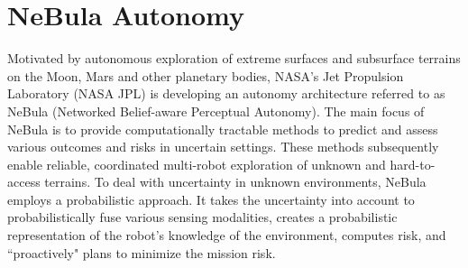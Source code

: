 \documentclass[letterpaper, 10pt, conference]{ieeeconf}      %
\newcommand{\rev}[1]{{\color{blue}#1}} %
\begin{document}
\section{NeBula Autonomy}\label{sec:nebula}
Motivated by autonomous exploration of extreme surfaces and subsurface terrains on the Moon, Mars and other planetary bodies, NASA's Jet Propulsion Laboratory (NASA JPL) is developing an autonomy architecture referred to as NeBula (Networked Belief-aware Perceptual Autonomy). 
The main focus of NeBula is to provide computationally tractable methods to predict and assess various outcomes and risks in uncertain settings. These methods subsequently enable reliable, coordinated multi-robot exploration of unknown and hard-to-access terrains. To deal with uncertainty in unknown environments, NeBula employs a probabilistic approach. It takes the uncertainty into account to probabilistically fuse various sensing modalities, creates a probabilistic representation of the robot's knowledge of the environment, computes risk, and ``proactively" plans to minimize the mission risk. 


\end{document}
